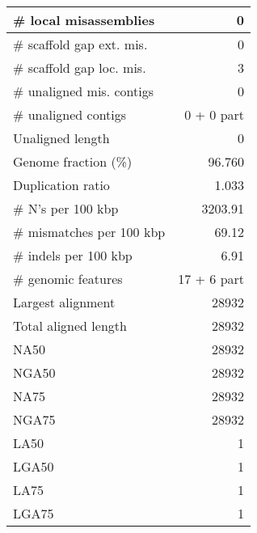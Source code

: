 \documentclass[12pt,a4paper]{article}
\begin{document}
\begin{table}[ht]
\begin{center}
\begin{tabular}{|l*{1}{|r}|}
\# local misassemblies & 0 \\ \hline
\# scaffold gap ext. mis. & 0 \\ \hline
\# scaffold gap loc. mis. & 3 \\ \hline
\# unaligned mis. contigs & 0 \\ \hline
\# unaligned contigs & 0 + 0 part \\ \hline
Unaligned length & 0 \\ \hline
Genome fraction (\%) & 96.760 \\ \hline
Duplication ratio & 1.033 \\ \hline
\# N's per 100 kbp & 3203.91 \\ \hline
\# mismatches per 100 kbp & 69.12 \\ \hline
\# indels per 100 kbp & 6.91 \\ \hline
\# genomic features & 17 + 6 part \\ \hline
Largest alignment & 28932 \\ \hline
Total aligned length & 28932 \\ \hline
NA50 & 28932 \\ \hline
NGA50 & 28932 \\ \hline
NA75 & 28932 \\ \hline
NGA75 & 28932 \\ \hline
LA50 & 1 \\ \hline
LGA50 & 1 \\ \hline
LA75 & 1 \\ \hline
LGA75 & 1 \\ \hline
\end{tabular}
\end{center}
\end{table}
\end{document}
